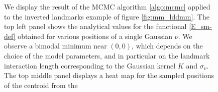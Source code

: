 \documentclass[runningheads]{llncs}
\begin{document}
\begin{figure}[h!]
    \caption{We display the result of the MCMC algorithm \ref{algo:mcmc} applied
    to the inverted landmarks example of figure \ref{fig:mm_lddmm}.  The top left
    panel shows the analytical values for the functional \eqref{E_sm-def}
    obtained for various positions of a single Gaussian $\nu$. We observe a
    bimodal minimum near $(0,0)$, which depends on the choice of the model
    parameters, and in particular on the landmark interaction length
    corresponding to the Gaussian kernel $K$ and $\sigma_\nu$.  The top middle
    panel displays a heat map for the sampled positions of the centroid from the
}
\end{figure}
\end{document}
